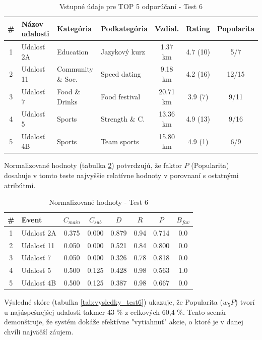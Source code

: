 \documentclass[12pt,a4paper]{article}
\begin{document}
\begin{table}[H]
\centering
\small
\begin{tabular}{|c|l|l|l|c|c|c|}
\hline
\textbf{\#} & \textbf{Názov udalosti} & \textbf{Kategória} & \textbf{Podkategória} & \textbf{Vzdial.} & \textbf{Rating} & \textbf{Popularita} \\
\hline
1 & Udalosť 2A & Education          & Jazykový kurz  & 1.37 km  & 4.7 (10) & 5/7 \\
2 & Udalosť 11 & Community \& Soc.  & Speed dating   & 9.18 km  & 4.2 (16) & 12/15 \\
3 & Udalosť 7  & Food \& Drinks     & Food festival  & 20.71 km & 3.9 (7)  & 9/11 \\
4 & Udalosť 5  & Sports             & Strength \& C. & 13.36 km & 4.9 (13) & 9/16 \\
5 & Udalosť 4B & Sports             & Team sports    & 15.80 km & 4.9 (1)  & 6/9 \\
\hline
\end{tabular}
\caption{Vstupné údaje pre TOP 5 odporúčaní - Test 6}
\label{tab:data_test6}
\end{table}

Normalizované hodnoty (tabuľka \ref{tab:norm_test6}) potvrdzujú, že faktor $P$ (Popularita) dosahuje v tomto teste najvyššie relatívne hodnoty v porovnaní s ostatnými atribútmi.

\begin{table}[H]
\centering
\small
\begin{tabular}{|c|l|c|c|c|c|c|c|}
\hline
\textbf{\#} & \textbf{Event} & $C_{main}$ & $C_{sub}$ & $D$ & $R$ & $P$ & $B_{fav}$ \\
\hline
1 & Udalosť 2A & 0.375 & 0.000 & 0.879 & 0.94 & 0.714 & 0.0 \\
2 & Udalosť 11 & 0.050 & 0.000 & 0.521 & 0.84 & 0.800 & 0.0 \\
3 & Udalosť 7  & 0.050 & 0.000 & 0.326 & 0.78 & 0.818 & 0.0 \\
4 & Udalosť 5  & 0.500 & 0.125 & 0.428 & 0.98 & 0.563 & 1.0 \\
5 & Udalosť 4B & 0.500 & 0.125 & 0.387 & 0.98 & 0.667 & 0.0 \\
\hline
\end{tabular}
\caption{Normalizované hodnoty - Test 6}
\label{tab:norm_test6}
\end{table}



Výsledné skóre (tabuľka \ref{tab:vysledky_test6}) ukazuje, že Popularita ($w_5 P$) tvorí u najúspešnejšej udalosti takmer 43 \% z celkových 60,4 \%. Tento scenár demonštruje, že systém dokáže efektívne "vytiahnuť" akcie, o ktoré je v danej chvíli najväčší záujem.
\end{document}
